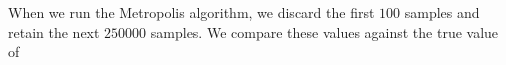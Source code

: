 \documentclass[graybox]{svmult}
\begin{document}
When we run the Metropolis algorithm, we discard the first $100$ samples and retain the next $250000$ samples. We compare these values against the true value of

\end{document}
